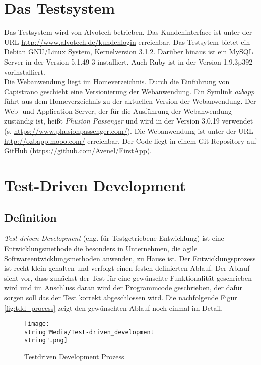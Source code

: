 \documentclass[12pt,             %
               a4paper,          %
               listof=totoc,     %
               index=totoc,      %
               bibliography=totoc,%
               oneside,         %
               BCOR1cm,          %
               english   %
               ]{scrbook}
\begin{document}
\section{Das Testsystem}\label{sec:Das_Testsystem}
Das Testsystem wird von Alvotech betrieben. Das Kundeninterface ist unter der URL \url{http://www.alvotech.de/kundenlogin} erreichbar. Das Testsytem bietet ein Debian GNU/Linux System, Kernelversion 3.1.2. Darüber hinaus ist ein MySQL Server in der Version 5.1.49-3 installiert. Auch Ruby ist in der Version 1.9.3p392 vorinstalliert.\\
Die Webanwendung liegt im Homeverzeichnis. Durch die Einführung von Capistrano geschieht eine Versionierung der Webanwendung. Ein Symlink \textit{ozbapp} führt aus dem Homeverzeichnis zu der aktuellen Version der Webanwendung. Der Web- und Application Server, der für die Ausführung der Webanwendung zuständig ist, heißt \textit{Phusion Passenger} und wird in der Version 3.0.19 verwendet (s. \url{https://www.phusionpassenger.com/}). Die Webanwendung ist unter der URL \url{http://ozbapp.mooo.com/} erreichbar. Der Code liegt in einem Git Repository auf GitHub (\url{https://github.com/Avenel/FirstApp}).


\section{Test-Driven Development}
\subsection{Definition}
\textit{Test-driven Development} (eng. für \glqq Testgetriebene Entwicklung\grqq) ist eine Entwicklungsmethode die besonders in Unternehmen, die agile Softwareentwicklungsmethoden anwenden, zu Hause ist. Der Entwicklungsprozess ist recht klein gehalten und verfolgt einen festen definierten Ablauf. Der Ablauf sieht vor, dass zunächst der Test für eine gewünschte Funktionalität geschrieben wird und im Anschluss daran wird der Programmcode geschrieben, der dafür sorgen soll das der Test korrekt abgeschlossen wird. Die nachfolgende Figur \vref{fig:tdd_process} zeigt den gewünschten Ablauf noch einmal im Detail.

\begin{figure}[H]
     \begin{center}
          \texttt{[image: \\string"Media/Test-driven\_development\\string".png]}
     \end{center}
     \label{fig:tdd_process}
     \caption{Testdriven Development Prozess}
\end{figure} 
\end{document}
